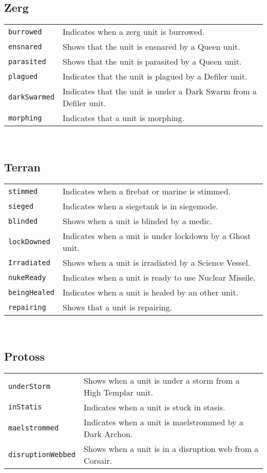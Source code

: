 \subsection{Zerg}
\begin{tabularx}{\textwidth}{lX}
\verb|burrowed| & Indicates when a zerg unit is burrowed. \\
\verb|ensnared| & Shows that the unit is ensnared by a Queen unit. \\
\verb|parasited| & Shows that the unit is parasited by a Queen unit. \\
\verb|plagued| & Indicates that the unit is plagued by a Defiler unit. \\
\verb|darkSwarmed| & Indicates that the unit is under a Dark Swarm from a Defiler unit. \\
\verb|morphing| & Indicates that a unit is morphing. \\
\end{tabularx} \\

\subsection{Terran}
\begin{tabularx}{\textwidth}{lX}
 \verb|stimmed| & Indicates when a firebat or marine is stimmed.\\
 \verb|sieged| & Indicates when a siegetank is in siegemode.\\
 \verb|blinded| & Shows when a unit is blinded by a medic. \\
 \verb|lockDowned| & Indicates when a unit is under lockdown by a Ghost unit. \\
 \verb|Irradiated| & Shows when a unit is irradiated by a Science Vessel. \\
 \verb|nukeReady| & Indicates when a unit is ready to use Nuclear Missile. \\
 \verb|beingHealed| & Indicates when a unit is healed by an other unit. \\
 \verb|repairing| & Shows that a unit is repairing. \\
\end{tabularx} \\

\subsection{Protoss}
\begin{tabularx}{\textwidth}{lX}
\verb|underStorm| & Shows when a unit is under a storm from a High Templar unit. \\
\verb|inStatis| & Indicates when a unit is stuck in stasis. \\
\verb|maelstrommed| & Indicates when a unit is maelstrommed by a Dark Archon. \\
\verb|disruptionWebbed| & Shows when a unit is in a disruption web from a Corsair. \\
\end{tabularx} \\

